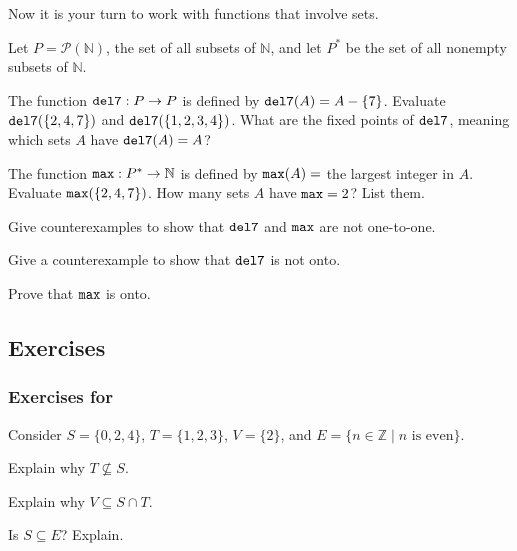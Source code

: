 Now it is your turn to work with functions that involve sets.

\begin{act}
\label{act_set_fns}
    Let $P = \mathscr{P}(\mathbb{N})$, the set of all subsets of $\mathbb{N}$, and let $P^*$ be the set of all nonempty subsets of $\mathbb{N}$.
    \begin{apart}
        \item The function $\texttt{del7}: P \to P$ is defined by $\texttt{del7}(A) = A-\{7\}$.  Evaluate $\texttt{del7}(\{2,4,7\})$ and $\texttt{del7}(\{1,2,3,4\})$.  What are the fixed points of $\texttt{del7}$, meaning which sets $A$ have $\texttt{del7}(A) = A$?
        \item The function $\texttt{max}:P^* \to \mathbb{N}$ is defined by $\texttt{max}(A)=$ the largest integer in $A$.  Evaluate $\texttt{max}(\{2,4,7\})$.  How many sets $A$ have $\texttt{max}=2$?  List them.
        \item Give counterexamples to show that $\texttt{del7}$ and $\texttt{max}$ are not one-to-one.
        \item Give a counterexample to show that $\texttt{del7}$ is not onto.
        \item Prove that $\texttt{max}$ is onto.
    \end{apart}
\end{act}

\subsection{Exercises}


\subsubsection*{Exercises for 
\subsubsets}

\begin{exer}[\exerP] %
\label{exer_subset_notation}
    Consider $S = \{0, 2, 4\}$, $T = \{1, 2, 3\}$, $V = \{2\}$, and $E = \{ n \in \mathbb{Z} \mid n \text{ is even} \}$.
        \begin{exerpart}
            \item Explain why $T \not\subseteq S$.
            \item Explain why $V \subseteq S \cap T$.
            \item Is $S \subseteq E$? Explain.
        \end{exerpart}
\end{exer}

